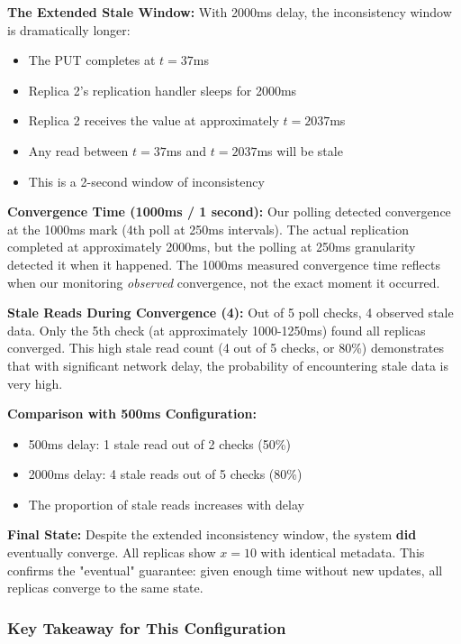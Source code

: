\documentclass[10pt,a4paper]{article}
\begin{document}
\textbf{The Extended Stale Window:} With 2000ms delay, the inconsistency window is dramatically longer:
\begin{itemize}
    \item The PUT completes at $t=37$ms
    \item Replica 2's replication handler sleeps for 2000ms
    \item Replica 2 receives the value at approximately $t=2037$ms
    \item Any read between $t=37$ms and $t=2037$ms will be stale
    \item This is a 2-second window of inconsistency
\end{itemize}

\textbf{Convergence Time (1000ms / 1 second):} Our polling detected convergence at the 1000ms mark (4th poll at 250ms intervals). The actual replication completed at approximately 2000ms, but the polling at 250ms granularity detected it when it happened. The 1000ms measured convergence time reflects when our monitoring \textit{observed} convergence, not the exact moment it occurred.

\textbf{Stale Reads During Convergence (4):} Out of 5 poll checks, 4 observed stale data. Only the 5th check (at approximately 1000-1250ms) found all replicas converged. This high stale read count (4 out of 5 checks, or 80\%) demonstrates that with significant network delay, the probability of encountering stale data is very high.

\textbf{Comparison with 500ms Configuration:}
\begin{itemize}
    \item 500ms delay: 1 stale read out of 2 checks (50\%)
    \item 2000ms delay: 4 stale reads out of 5 checks (80\%)
    \item The proportion of stale reads increases with delay
\end{itemize}

\textbf{Final State:} Despite the extended inconsistency window, the system \textbf{did} eventually converge. All replicas show $x=10$ with identical metadata. This confirms the "eventual" guarantee: given enough time without new updates, all replicas converge to the same state.

\subsubsection{Key Takeaway for This Configuration}
\end{document}
